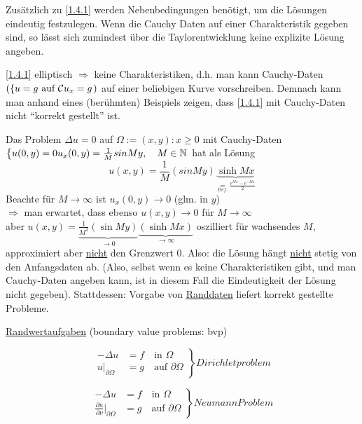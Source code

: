 Zusätzlich zu \eqref{1.4.1} werden Nebenbedingungen benötigt, um die Lösungen eindeutig festzulegen. Wenn die Cauchy Daten auf einer Charakteristik gegeben sind, so lässt sich zumindest über die Taylorentwicklung keine explizite Lösung angeben. 

\eqref{1.4.1} elliptisch $\Rightarrow$ keine Charakteristiken, d.h. man kann Cauchy-Daten $\left( \left\{ u = g \text{ auf } \mathcal{C}\\ u_x = g \right. \right)$ auf einer beliebigen Kurve vorschreiben. Demnach kann man anhand eines (berühmten) Beispiels zeigen, dass \eqref{1.4.1} mit Cauchy-Daten nicht ``korrekt gestellt'' ist. 

\begin{beispiel} %
    Das Problem $\Delta u = 0 $ auf $\Omega := {(x,y): x\geq 0}$ mit Cauchy-Daten $\left\{ u(0,y) = 0\\ u_x(0,y) = \frac{1}{M}sin My, \quad M\in\mathbb{N} \right.$ hat als Lösung 
    \[
        u(x,y) = \frac{1}{M}(sin My) \underbrace{\sinh Mx}_{\underset{Def.}{=} \frac{e^{Mx}-e^{-Mx}}{2}}
    \]
    Beachte für $M\to\infty$ ist $u_x(0,y)\to 0$ (glm. in $y$) \\

    $\Rightarrow$ man erwartet, dass ebenso $u(x,y)\to 0$ für $M\to\infty$\\

    aber $u(x,y) = \underbrace{\frac{1}{M^2}(\sin My)}_{\to 0}\underbrace{(\sinh Mx)}_{\to\infty}$ oszilliert für wachsendes $M$, approximiert aber \underline{nicht} den Grenzwert $0$. Also: die Lösung hängt \underline{nicht} stetig von den Anfangsdaten ab. (Also, selbst wenn es keine Charakteristiken gibt, und man Cauchy-Daten angeben kann, ist in diesem Fall die Eindeutigkeit der Lösung nicht gegeben).
Stattdessen: Vorgabe von \underline{Randdaten} liefert korrekt gestellte Probleme.
\end{beispiel}

\underline{Randwertaufgaben} (boundary value problems: bvp)

\begin{equation} %
    \left.  
    \begin{aligned}
        -\Delta u & = f \quad \text{in } \Omega\\
        u\big|_{\partial\Omega} & = g \quad \text{auf } \partial\Omega
    \end{aligned}
\right\} Dirichletproblem
\label{eq:dirichlet}
\end{equation}

\begin{equation} %
    \left.  
    \begin{aligned}
        -\Delta u & = f \quad \text{in } \Omega\\
        \frac{\partial u}{\partial \nu}\big|_{\partial\Omega} & = g \quad \text{auf } \partial\Omega
    \end{aligned}
\right\} Neumann Problem
\label{eq:neumann}
\end{equation}

